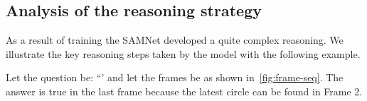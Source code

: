 


\subsection{Analysis of the reasoning strategy}
As a result of training the SAMNet developed a quite complex reasoning.
We illustrate the key reasoning steps taken by the model with the following example.

Let the question be: ``'
and let the frames be as shown in~\cref{fig:frame-seq}.
The answer is true in the last frame because the latest circle can be found in Frame 2. 

